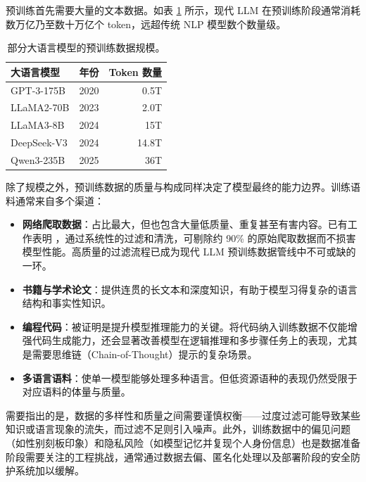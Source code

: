 预训练首先需要大量的文本数据。如表 \ref{tab:training-data-size-llm} 所示，现代 LLM 在预训练阶段通常消耗数万亿乃至数十万亿个 token，远超传统 NLP 模型数个数量级。

\begin{table}[t]
  \centering
  \begingroup
  \renewcommand{\arraystretch}{1.2}
  \begin{tabular}{l | r | r}
  大语言模型 & 年份 & Token 数量 \\ \hline
  GPT-3-175B \cite{brown-etal:2020language} & 2020 & 0.5T \\
  LLaMA2-70B \cite{touvron-etal:2023llama} & 2023 & 2.0T \\
  LLaMA3-8B \cite{dubey2024llama} & 2024 & 15T \\
  DeepSeek-V3 \cite{liu2024deepseek} & 2024 & 14.8T \\
  Qwen3-235B \cite{yang2025qwen3} & 2025 & 36T
  \end{tabular}
  \endgroup
  \caption{部分大语言模型的预训练数据规模。}
  \label{tab:training-data-size-llm}
\end{table}

除了规模之外，预训练数据的质量与构成同样决定了模型最终的能力边界。训练语料通常来自多个渠道：

\begin{itemize}
  \item \textbf{网络爬取数据}：占比最大，但也包含大量低质量、重复甚至有害内容。已有工作表明 \cite{penedo-etal:2023refinedweb}，通过系统性的过滤和清洗，可剔除约 90\% 的原始爬取数据而不损害模型性能。高质量的过滤流程已成为现代 LLM 预训练数据管线中不可或缺的一环。
  \item \textbf{书籍与学术论文}：提供连贯的长文本和深度知识，有助于模型习得复杂的语言结构和事实性知识。
  \item \textbf{编程代码}：被证明是提升模型推理能力的关键。将代码纳入训练数据不仅能增强代码生成能力，还会显著改善模型在逻辑推理和多步骤任务上的表现，尤其是需要思维链（Chain-of-Thought）提示的复杂场景。
  \item \textbf{多语言语料}：使单一模型能够处理多种语言。但低资源语种的表现仍然受限于对应语料的体量与质量。
\end{itemize}

需要指出的是，数据的多样性和质量之间需要谨慎权衡——过度过滤可能导致某些知识或语言现象的流失，而过滤不足则引入噪声。此外，训练数据中的偏见问题（如性别刻板印象）和隐私风险（如模型记忆并复现个人身份信息）也是数据准备阶段需要关注的工程挑战，通常通过数据去偏、匿名化处理以及部署阶段的安全防护系统加以缓解。

